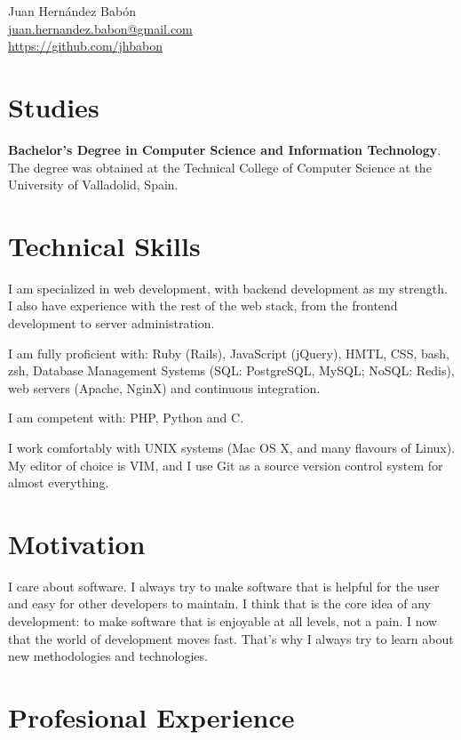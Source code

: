 \documentclass[10pt, a4paper]{article}
\begin{document}
\reversemarginpar
{\LARGE Juan Hernández Babón}\\[0.25cm]
\href{mailto:juan.hernandez.babon@gmail.com}{juan.hernandez.babon@gmail.com}\\
\href{https://github.com/jhbabon}{https://github.com/jhbabon}\\

\section*{Studies}

\textbf{Bachelor's Degree in Computer Science and Information Technology}. The degree was obtained at the Technical College of Computer Science at the University of Valladolid, Spain.

\section*{Technical Skills}

I am specialized in web development, with backend development as my strength. I also have experience with the rest of the web stack, from the frontend development to server administration.

I am fully proficient with: Ruby (Rails), JavaScript (jQuery), HMTL, CSS, bash, zsh, Database Management Systems (SQL: PostgreSQL, MySQL; NoSQL: Redis), web servers (Apache, NginX) and continuous integration.

I am competent with: PHP, Python and C.

I work comfortably with UNIX systems (Mac OS X, and many flavours of Linux). My editor of choice is VIM, and I use Git as a source version control system for almost everything.

\section*{Motivation}

I care about software. I always try to make software that is helpful for the user and easy for other developers to maintain. I think that is the core idea of any development: to make software that is enjoyable at all levels, not a pain. I now that the world of development moves fast. That's why I always try to learn about new methodologies and technologies.

\section*{Profesional Experience}
\end{document}
